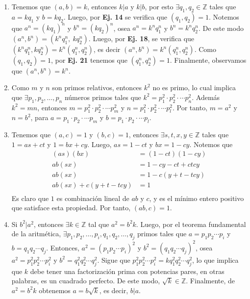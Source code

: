 \documentclass[11pt]{article}
\newcommand{\Z}{\mathbb{Z}}
\begin{document}
\begin{enumerate}[start=10]
  \item Tenemos que $(a,b)=k$, entonces $k|a$ y $k|b$, por esto $\exists q_1, q_2 \in \Z$ tales que $a=kq_1$ y $b=kq_2$. Luego, por \textbf{Ej. 14} se verifica que $(q_1,q_2)=1$. Notemos que $a^n=(kq_1)^n$ y $b^n=(kq_2)^n$, osea $a^n=k^nq_1^n$ y $b^n=k^nq_2^n$. De este modo $(a^n,b^n)=(k^nq_1^n, \ kq_2^n)$. Luego, por \textbf{Ej. 18}, se verifica que $(k^nq_1^n, kq_2^n)=k^n(q_1^n, q_2^n)$, es decir $(a^n,b^n)=k^n(q_1^n, q_2^n)$. Como $(q_1,q_2)=1$, por \textbf{Ej. 21} tenemos que $(q_1^n,q_2^n)=1$. Finalmente, observamos que $(a^n,b^n)=k^n$.
  \item Como $m$ y $n$ son primos relativos, entonces $k^2$ no es primo, lo cual implica que $\exists p_1,p_2, \dots ,p_n$ números primos tales que $k^2=p_1^2 \cdot p_2^2 \cdot \cdots p_n^2$. Además $k^2=mn$, entonces $m=p_1^2 \cdot p_2^2 \cdot \cdots p_m^2$ y $n=p_1^2 \cdot p_2^2 \cdot \cdots p_l^2$. Por tanto, $m=a^2$ y $n=b^2$, para $a=p_1 \cdot p_2 \cdot \cdots p_m$ y $b=p_1 \cdot p_2 \cdot \cdots p_l$.
  \item Tenemos que $(a,c)=1$ y $(b,c)=1$, entonces $\exists s,t,x,y\in\Z$ tales que $1=as+ct$ y $1=bx+cy$. Luego, $as=1-ct$ y $bx=1-cy$. Notemos que
    \begin{align*}
      (as)(bx) &= (1-ct)(1-cy) \\
      ab(sx) &= 1-cy-ct+ctcy \\
      ab(sx) &= 1-c(y+t-tcy) \\
      ab(sx) + c(y+t-tcy) &= 1 \\
    \end{align*}
  Es claro que $1$ es combinación lineal de $ab$ y $c$, y es el mínimo entero positivo que satisface esta propiedad. Por tanto, $(ab,c)=1$.
  \item Si $b^2|a^2$, entonces $\exists k\in\Z$ tal que $a^2=b^2k$. Luego, por el teorema fundamental de la aritmética, $\exists p_1,p_2, \dots, p_i, q_1,q_2, \dots, q_j$ primos tales que $a=p_1p_2 \cdots p_i$ y $b=q_1q_2 \cdots q_j$. Entonces, $a^2=(p_1p_2 \cdots p_i)^2$ y $b^2=(q_1q_2 \cdots q_j)^2$, osea $a^2=p_1^2p_2^2 \cdots p_i^2$ y $b^2=q_1^2q_2^2 \cdots q_j^2$. Sigue que $p_1^2p_2^2 \cdots p_i^2=kq_1^2q_2^2 \cdots q_j^2$, lo que implica que $k$ debe tener una factorización prima con potencias pares, en otras palabras, es un cuadrado perfecto. De este modo, $\sqrt{k}\in \Z$. Finalmente, de $a^2=b^2k$ obtenemos $a=b\sqrt{k}$, es decir, $b|a$.

\end{enumerate}
\end{document}
